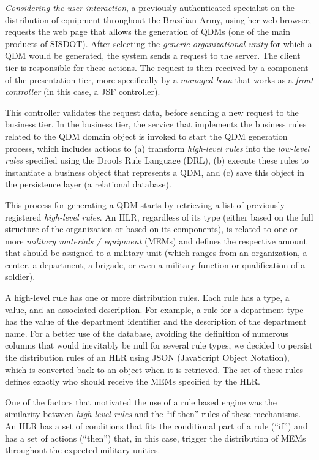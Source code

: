 \documentclass[twocolumn]{bmcart}%
\newcommand{\callers}{\emph{high-level rules}\xspace}
\newcommand{\shc}{HLR\xspace}
\begin{document}
\emph{Considering the user interaction}, a previously authenticated specialist on the distribution of equipment throughout the Brazilian Army, using her web browser, requests the web page that allows the generation of QDMs (one of the main products of SISDOT). 
After selecting the \emph{generic organizational unity} for which a QDM would be generated, the system sends a request to the server. The client tier is responsible for these actions. The request is then received by a component of the presentation tier, more specifically by a \emph{managed bean} that works as a \emph{front controller} (in this case, a JSF controller). 

This controller validates the request data, before sending a new request to the business tier. In the business tier, the service 
that implements the business rules related to the QDM domain object is invoked to start the QDM generation process, which includes actions to (a) transform \callers into the \emph{low-level rules} specified using the Drools Rule Language (DRL), (b) execute these rules to instantiate a business object that represents a QDM, and (c) save this object in the persistence layer (a relational database). 

This process for generating a QDM starts by retrieving a list of previously registered \callers. An \shc, regardless of its type (either based on the full structure of the organization or based on its components), is related to one or more \emph{military materials / equipment} (MEMs) and defines the respective amount that should be assigned to a military unit (which ranges from an organization, a center, a department, a brigade, or even a military function or qualification of a soldier). 

A high-level rule has one or more distribution rules. Each rule has a type, a value, and an associated description. For example, a rule for a department type has the value of the department identifier and the description of the department name. For a better use of the database, avoiding the definition of numerous columns that would inevitably be null for several rule types, we decided to persist the distribution rules of an \shc using JSON (JavaScript Object Notation), which is converted back to an object when it is retrieved. The set of these rules defines exactly who should receive the MEMs specified by the \shc.

One of the factors that motivated the use of a rule based engine was the similarity between \callers and the ``if-then'' rules of these mechanisms.  %
An \shc has a set of conditions that fits the conditional part of a rule (``if'') and has a set of actions (``then'') that, in this case, trigger the distribution of MEMs throughout the expected military unities.
\end{document}
